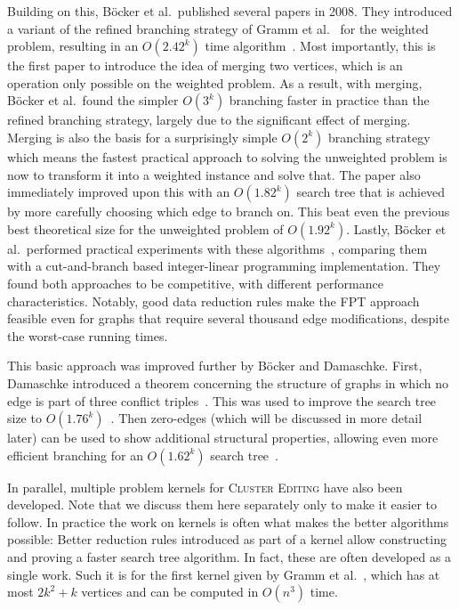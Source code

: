 \documentclass[12pt,oneside,english,parskip=full,headings=small]{scrbook}
\theoremstyle{definition}
\begin{document}
Building on this, Böcker et al.\ published several papers in 2008. They introduced a variant of the
refined branching strategy of Gramm et al.~\cite{Gramm} for the weighted problem, resulting in an
$O(2.42^k)$ time algorithm~\cite{AnApproach}. Most importantly, this is the first paper to introduce
the idea of merging two vertices, which is an operation only possible on the weighted problem. As a
result, with merging, Böcker et al.\ found the simpler $O(3^k)$ branching faster in practice than
the refined branching strategy, largely due to the significant effect of merging. Merging is also
the basis for a surprisingly simple $O(2^k)$ branching strategy~\cite{GoingWeighted} which means the
fastest practical approach to solving the unweighted problem is now to transform it into a weighted
instance and solve that. The paper also immediately improved upon this with an $O(1.82^k)$ search
tree that is achieved by more carefully choosing which edge to branch on. This beat even the
previous best theoretical size for the unweighted problem of $O(1.92^k)$. Lastly, Böcker et al.\
performed practical experiments with these algorithms~\cite{ExactAlgos}, comparing them with a
cut-and-branch based integer-linear programming implementation. They found both approaches to be
competitive, with different performance characteristics. Notably, good data reduction rules make the
FPT approach feasible even for graphs that require several thousand edge modifications, despite the
worst-case running times.

This basic approach was improved further by Böcker and Damaschke. First, Damaschke introduced a
theorem concerning the structure of graphs in which no edge is part of three conflict
triples~\cite{BoundedDegree}. This was used to improve the search tree size to
$O(1.76^k)$~\cite{EvenFaster}. Then zero-edges (which will be discussed in more detail later) can be
used to show additional structural properties, allowing even more efficient branching for an
$O(1.62^k)$ search tree~\cite{GoldenRatio}.

In parallel, multiple problem kernels for \textsc{Cluster Editing} have also been developed. Note
that we discuss them here separately only to make it easier to follow. In practice the work on
kernels is often what makes the better algorithms possible: Better reduction rules introduced as
part of a kernel allow constructing and proving a faster search tree algorithm. In fact, these are
often developed as a single work. Such it is for the first kernel given by Gramm et al.~\cite{Gramm},
which has at most $2k^2 + k$ vertices and can be computed in $O(n^3)$ time.
\end{document}

